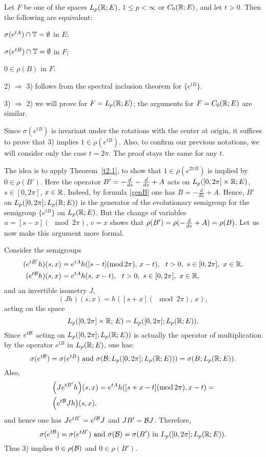 \begin{thm}
Let $F$ be one of the spaces
$L_p ({\Bbb{R}};E)$, $1\leq p < \infty$
or  $C_0({\Bbb{R}};E)$, and let $t>0$.
Then the following are equivalent:
\begin{list}{)}{}
\item $\sigma (e^{tA}) \cap {\Bbb{T}} =\emptyset$ in $E$;
\item $\sigma (e^{tB}) \cap {\Bbb{T}} =\emptyset$ in $F$;
\item $0\in \rho (B)$ in $F$.
\end{list} \end{thm}

\begin{pf}
2) $\Rightarrow$ 3) follows from the spectral inclusion theorem
for $\{e^{tB}\}$.

3) $\Rightarrow$  2)
we will prove for $F=L_p({\Bbb{R}};E)$;
the arguments for $F=C_0({\Bbb{R}};E)$ are similar.

Since $\sigma (e^{tB})$ is invariant
under the rotations with the center at origin, it
suffices to prove that 3) implies
$1\in \rho (e^{tB})$. Also, to confirm our
previous notations, we will consider only the case $t=2\pi$.
The proof stays the same for any $t$.

The idea is to apply Theorem~\ref{t2.1}, to show that
$1\in\rho(e^{2\pi B})$ is implied by
$0\in\rho(B')$. Here the operator
$B'= -{d\over ds} - {d\over dx} + A$ acts on
$L_p([0,2\pi]\times {\Bbb{R}}; E)$, $s\in[0,2\pi]$,
$x\in {\Bbb{R}}$.
Indeed, by formula \eqref{genB} one has $B=-\frac{d}{dx}+A$.
Hence, $B'$ on $L_p([0,2\pi]; L_p({\Bbb{R}}; E))$ is the generator
of the evolutionary semigroup for the semigroup
$\{e^{tB}\}$ on $L_p({\Bbb{R}}; E)$.
But the change of variables $u = [s-x] (\mod 2\pi)$,
$v = x$ shows that $\rho(B') = \rho (-{d\over dv} + A) = \rho(B)$.
Let us now make this argument more formal.

Consider the semigroups
\begin{align*}
( e^{tB'}h)(s,x) &= e^{tA} h( [s-t] (\operatorname{mod} 2\pi),\, x-t),~~t>0,
~s\in [0,2\pi],~x\in {\Bbb{R}}, \\
(e^{t{\cal{B}}}h)(s,x) &= e^{tA}h(s,\,x-t),~~t>0,
~s\in [0,2\pi],~x\in {\Bbb{R}},
\end{align*}
and an invertible isometry $J$,
$$
(Jh)(s,x)= h( [s+x] (\mod 2\pi),\, x),
$$
acting on the space
$$L_p([0,2\pi]\times {\Bbb{R}};\, E) = L_p([0, 2\pi]; L_p({\Bbb{R}}; E)).
$$
Since $e^{t{\cal{B}}}$ acting
on $L_p([0, 2\pi]; L_p({\Bbb{R}}; E))$ is actually the
operator of multiplication by the operator $e^{tB}$ in $L_p({\Bbb{R}};E)$,
one has:
$$\sigma (e^{t{\cal{B}}})=\sigma (e^{tB})\mbox{ and }
\sigma({\cal{B}}; L_p([0,2\pi]; L_p({\Bbb{R}}; E)))=\sigma(B; L_p({\Bbb{R}}; E)).$$
Also,
\begin{align*}
& \Big(Je^{tB'}h\Big)(s,x)=
e^{tA}h( [s+x-t](\operatorname{mod} 2\pi), x-t )=  \\
& \Big(e^{t{\cal{B}}}Jh\big)(s,x),
\end{align*}
and hence
one has $Je^{tB'}=e^{t{\cal{B}}}J$ and $JB'={\cal{B}} J$. Therefore,
$$\sigma (e^{t{\cal{B}}})=\sigma (e^{tB'}) \mbox{ and }
\sigma({\cal{B}})=\sigma(B')\mbox{ in } L_p([0,2\pi]; L_p({\Bbb{R}}; E)).$$
Thus 3) implies
$0\in\rho ({\cal{B}})$ and $0\in \rho (B')$.


\end{pf}
